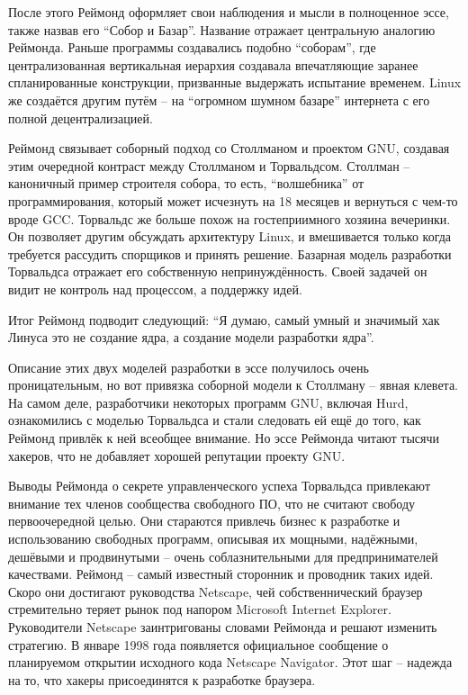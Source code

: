 После этого Реймонд оформляет свои наблюдения и мысли в полноценное эссе, также назвав его \enquote{Собор и Базар}. Название отражает центральную аналогию Реймонда. Раньше программы создавались подобно \enquote{соборам}, где централизованная вертикальная иерархия создавала впечатляющие заранее спланированные конструкции, призванные выдержать испытание временем. Linux же создаётся другим путём -- на \enquote{огромном шумном базаре} интернета с его полной децентрализацией.

Реймонд связывает соборный подход со Столлманом и проектом GNU, создавая этим очередной контраст между Столлманом и Торвальдсом. Столлман -- каноничный пример строителя собора, то есть, \enquote{волшебника} от программирования, который может исчезнуть на 18 месяцев и вернуться с чем-то вроде GCC. Торвальдс же больше похож на гостеприимного хозяина вечеринки. Он позволяет другим обсуждать архитектуру Linux, и вмешивается только когда требуется рассудить спорщиков и принять решение. Базарная модель разработки Торвальдса отражает его собственную непринуждённость. Своей задачей он видит не контроль над процессом, а поддержку идей.

Итог Реймонд подводит следующий: \enquote{Я думаю, самый умный и значимый хак Линуса это не создание ядра, а создание модели разработки ядра}.

Описание этих двух моделей разработки в эссе получилось очень проницательным, но вот привязка соборной модели к Столлману -- явная клевета. На самом деле, разработчики некоторых программ GNU, включая Hurd, ознакомились с моделью Торвальдса и стали следовать ей ещё до того, как Реймонд привлёк к ней всеобщее внимание. Но эссе Реймонда читают тысячи хакеров, что не добавляет хорошей репутации проекту GNU.

Выводы Реймонда о секрете управленческого успеха Торвальдса привлекают внимание тех членов сообщества свободного ПО, что не считают свободу первоочередной целью. Они стараются привлечь бизнес к разработке и использованию свободных программ, описывая их мощными, надёжными, дешёвыми и продвинутыми -- очень соблазнительными для предпринимателей качествами. Реймонд -- самый известный сторонник и проводник таких идей. Скоро они достигают руководства Netscape, чей собственнический браузер стремительно теряет рынок под напором Microsoft Internet Explorer. Руководители Netscape заинтригованы словами Реймонда и решают изменить стратегию. В январе 1998 года появляется официальное сообщение о планируемом открытии исходного кода Netscape Navigator. Этот шаг -- надежда на то, что хакеры присоединятся к разработке браузера.

